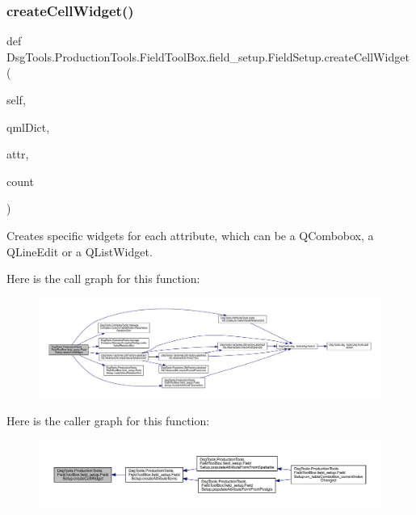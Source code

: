 \subsubsection{\texorpdfstring{create\+Cell\+Widget()}{createCellWidget()}}
{\footnotesize\ttfamily def Dsg\+Tools.\+Production\+Tools.\+Field\+Tool\+Box.\+field\+\_\+setup.\+Field\+Setup.\+create\+Cell\+Widget (\begin{DoxyParamCaption}\item[{}]{self,  }\item[{}]{qml\+Dict,  }\item[{}]{attr,  }\item[{}]{count }\end{DoxyParamCaption})}

\begin{DoxyVerb}Creates specific widgets for each attribute, which can be a QCombobox, a QLineEdit or a QListWidget.
\end{DoxyVerb}
 Here is the call graph for this function\+:
\nopagebreak
\begin{figure}[H]
\begin{center}
\leavevmode
\includegraphics[width=350pt]{class_dsg_tools_1_1_production_tools_1_1_field_tool_box_1_1field__setup_1_1_field_setup_aa84f33d5c8b64e1d511cfbda1731e99e_cgraph}
\end{center}
\end{figure}
Here is the caller graph for this function\+:
\nopagebreak
\begin{figure}[H]
\begin{center}
\leavevmode
\includegraphics[width=350pt]{class_dsg_tools_1_1_production_tools_1_1_field_tool_box_1_1field__setup_1_1_field_setup_aa84f33d5c8b64e1d511cfbda1731e99e_icgraph}
\end{center}
\end{figure}
\mbox{\label{class_dsg_tools_1_1_production_tools_1_1_field_tool_box_1_1field__setup_1_1_field_setup_aa31edcd4f7d88997322483f4a9e53e5a}} 
